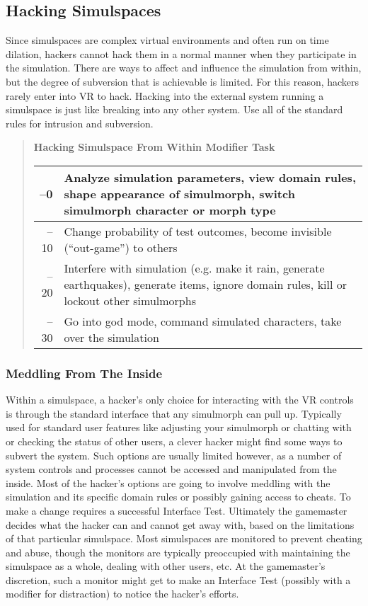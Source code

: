 \subsection{Hacking Simulspaces}

Since simulspaces are complex virtual environments 
and often run on time dilation, hackers cannot hack 
them in a normal manner when they participate in the 
simulation. There are ways to affect and influence the 
simulation from within, but the degree of subversion 
that is achievable is limited. For this reason, hackers 
rarely enter into VR to hack. Hacking into the external
system running a simulspace is just like breaking
into any other system. Use all of the standard rules for 
intrusion and subversion.

\begin{quotation}
\textbf{Hacking Simulspace From Within Modifier Task} \\
\begin{tabularx}{\textwidth}{|rX|}
\hline
–0 & Analyze simulation parameters, view domain rules, shape appearance of simulmorph, switch simulmorph character or morph type \\
\hline
–10 & Change probability of test outcomes, become invisible (“out-game”) to others \\
\hline
–20 & Interfere with simulation (e.g. make it rain, generate earthquakes), generate items, ignore domain rules, kill or lockout other simulmorphs \\
\hline
–30 & Go into god mode, command simulated characters, take over the simulation \\
\hline
\end{tabularx}
\end{quotation}

\subsubsection{Meddling From The Inside}

Within a simulspace, a hacker's only choice for interacting
with the VR controls is through the standard
interface that any simulmorph can pull up. Typically 
used for standard user features like adjusting your 
simulmorph or chatting with or checking the status 
of other users, a clever hacker might find some ways 
to subvert the system. Such options are usually limited
however, as a number of system controls and
processes cannot be accessed and manipulated from 
the inside.
Most of the hacker's options are going to involve 
meddling with the simulation and its specific domain 
rules or possibly gaining access to cheats. To make a 
change requires a successful Interface Test. Ultimately 
the gamemaster decides what the hacker can and 
cannot get away with, based on the limitations of that 
particular simulspace.
Most simulspaces are monitored to prevent cheating
and abuse, though the monitors are typically preoccupied
with maintaining the simulspace as a whole,
dealing with other users, etc. At the gamemaster's 
discretion, such a monitor might get to make an Interface
Test (possibly with a modifier for distraction) to
notice the hacker's efforts.

